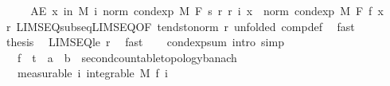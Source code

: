 \begin{isabellebody}
\ \ \isamarkupfalse%
\ \isamarkupfalse%
\ {\isachardoublequoteopen}AE\ x\ in\ M{\isachardot}{\kern0pt}\ {\isacharparenleft}{\kern0pt}{\isasymlambda}i{\isachardot}{\kern0pt}\ norm\ {\isacharparenleft}{\kern0pt}cond{\isacharunderscore}{\kern0pt}exp\ M\ F\ {\isacharparenleft}{\kern0pt}s\ {\isacharparenleft}{\kern0pt}r\ {\isacharparenleft}{\kern0pt}r{\isacharprime}{\kern0pt}\ i{\isacharparenright}{\kern0pt}{\isacharparenright}{\kern0pt}{\isacharparenright}{\kern0pt}\ x{\isacharparenright}{\kern0pt}{\isacharparenright}{\kern0pt}\ {\isasymlonglonglongrightarrow}\ norm\ {\isacharparenleft}{\kern0pt}cond{\isacharunderscore}{\kern0pt}exp\ M\ F\ f\ x{\isacharparenright}{\kern0pt}{\isachardoublequoteclose}\ \isamarkupfalse%
\ r\ LIMSEQ{\isacharunderscore}{\kern0pt}subseq{\isacharunderscore}{\kern0pt}LIMSEQ{\isacharbrackleft}{\kern0pt}OF\ tendsto{\isacharunderscore}{\kern0pt}norm\ r{\isacharprime}{\kern0pt}{\isacharparenleft}{\kern0pt}{}{\isacharparenright}{\kern0pt}{\isacharcomma}{\kern0pt}\ unfolded\ comp{\isacharunderscore}{\kern0pt}def{\isacharbrackright}{\kern0pt}\ \isamarkupfalse%
\ fast\isanewline
\ \ \isamarkupfalse%
\ \isamarkupfalse%
\ {\isacharquery}{\kern0pt}thesis\ \isamarkupfalse%
\ LIMSEQ{\isacharunderscore}{\kern0pt}le\ r{\isacharprime}{\kern0pt}{\isacharparenleft}{\kern0pt}{}{\isacharparenright}{\kern0pt}\ \isamarkupfalse%
\ fast\isanewline
{}\isamarkupfalse%
%
\endisatagproof
{\isafoldproof}%
%
\isadelimproof
\isanewline
%
\endisadelimproof
\ \ \isanewline
{}\isamarkupfalse%
\ cond{\isacharunderscore}{\kern0pt}exp{\isacharunderscore}{\kern0pt}sum\ {\isacharbrackleft}{\kern0pt}intro{\isacharcomma}{\kern0pt}\ simp{\isacharbrackright}{\kern0pt}{\isacharcolon}{\kern0pt}\isanewline
\ \ \ f\ {\isacharcolon}{\kern0pt}{\isacharcolon}{\kern0pt}\ {\isachardoublequoteopen}{\isacharprime}{\kern0pt}t\ {\isasymRightarrow}\ {\isacharprime}{\kern0pt}a\ {\isasymRightarrow}\ {\isacharprime}{\kern0pt}b\ {\isacharcolon}{\kern0pt}{\isacharcolon}{\kern0pt}\ {\isacharbraceleft}{\kern0pt}second{\isacharunderscore}{\kern0pt}countable{\isacharunderscore}{\kern0pt}topology{\isacharcomma}{\kern0pt}banach{\isacharbraceright}{\kern0pt}{\isachardoublequoteclose}\isanewline
\ \ \ {\isacharbrackleft}{\kern0pt}measurable{\isacharbrackright}{\kern0pt}{\isacharcolon}{\kern0pt}\ {\isachardoublequoteopen}{\isasymAnd}i{\isachardot}{\kern0pt}\ integrable\ M\ {\isacharparenleft}{\kern0pt}f\ i{\isacharparenright}{\kern0pt}{\isachardoublequoteclose}\isanewline

\end{isabellebody}
